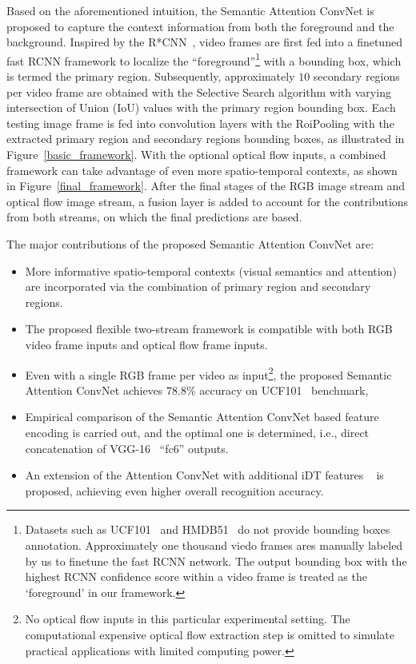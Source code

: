 \documentclass[10pt,twocolumn,letterpaper]{article}
\begin{document}
Based on the aforementioned intuition, the Semantic Attention ConvNet is proposed to capture the context information from both the foreground and the background. Inspired by the R*CNN~\cite{gkioxari2015contextual}, video frames are first fed into a finetuned fast RCNN framework to localize the ``foreground''\footnote{Datasets such as UCF101~\cite{soomro2012ucf101} and HMDB51~\cite{Kuehne11} do not provide bounding boxes annotation. Approximately one thousand viedo frames ares manually labeled by us to finetune the fast RCNN network. The output bounding box with the highest RCNN confidence score within a video frame is treated as the `foreground' in our framework.} with a bounding box, which is termed the {{primary region}}. Subsequently, approximately $10$ {{secondary regions}} per video frame are obtained with the Selective Search algorithm \cite{van2011segmentation} with varying intersection of Union (IoU) values with the primary region bounding box. Each testing image frame is fed into convolution layers with the RoiPooling\cite{girshick2016region} with the extracted primary region and secondary regions bounding boxes, as illustrated in Figure~\ref{basic_framework}. With the optional optical flow inputs, a combined framework can take advantage of even more spatio-temporal contexts, as shown in Figure~\ref{final_framework}. After the final stages of the RGB image stream and optical flow image stream, a fusion layer is added to account for the contributions from both streams, on which the final predictions are based.

The major contributions of the proposed Semantic Attention ConvNet are:
\noindent 
%
\begin{itemize}[leftmargin=*,itemsep=0cm,topsep=0cm,parsep=0cm] %
%
\item More informative spatio-temporal contexts (visual semantics and attention) are incorporated via the combination of primary region and secondary regions. 
\item The proposed flexible two-stream framework is compatible with both RGB video frame inputs and optical flow frame inputs. 
\item Even with a single RGB frame per video as input\footnote{No optical flow inputs in this particular experimental setting. The computational expensive optical flow extraction step is omitted to simulate practical applications with limited computing power.}, the proposed Semantic Attention ConvNet achieves $78.8\%$ accuracy on UCF101~\cite{soomro2012ucf101} benchmark, 
\item Empirical comparison of the Semantic Attention ConvNet based feature encoding is carried out, and the optimal one is determined, i.e., direct concatenation of VGG-16~\cite{simonyan2014very} ``fc6'' outputs.
\item An extension of the Attention ConvNet with additional iDT features ~\cite{wang2013action} is proposed, achieving even higher overall recognition accuracy.
%
\end{itemize}
%
\end{document}
